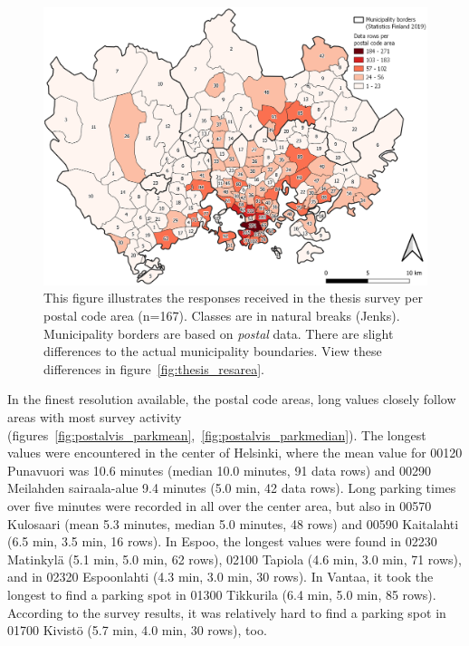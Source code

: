\begin{figure}[H]%
    \centering
    \includegraphics[width=\textwidth]{images/thesis_postalvis_answers.png}
    \caption[Data rows received per postal code area]{This figure illustrates the responses received in the thesis survey per postal code area (n=167). Classes are in natural breaks (Jenks). Municipality borders are based on \textit{postal} data. There are slight differences to the actual municipality boundaries. View these differences in figure~\ref{fig:thesis_resarea}.}%
    \label{fig:postalvis_answers}%
\end{figure}

In the finest resolution available, the postal code areas, long  values closely follow areas with most survey activity (figures~\ref{fig:postalvis_parkmean},~\ref{fig:postalvis_parkmedian}). The longest  values were encountered in the center of Helsinki, where the mean value for 00120 Punavuori was 10.6 minutes (median 10.0 minutes, 91 data rows) and 00290 Meilahden sairaala-alue 9.4 minutes (5.0 min, 42 data rows). Long parking times over five minutes were recorded in all over the center area, but also in 00570 Kulosaari (mean 5.3 minutes, median 5.0 minutes, 48 rows) and 00590 Kaitalahti (6.5 min, 3.5 min, 16 rows). In Espoo, the longest  values were found in 02230 Matinkylä (5.1 min, 5.0 min, 62 rows), 02100 Tapiola (4.6 min, 3.0 min, 71 rows), and in 02320 Espoonlahti (4.3 min, 3.0 min, 30 rows). In Vantaa, it took the longest to find a parking spot in 01300 Tikkurila (6.4 min, 5.0 min, 85 rows). According to the survey results, it was relatively hard to find a parking spot in 01700 Kivistö (5.7 min, 4.0 min, 30 rows), too.

